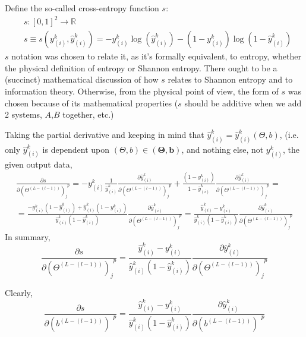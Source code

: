 \documentclass[10pt]{amsart}
\begin{document}
\begin{multicols*}{2}
Define the so-called cross-entropy function $s$:
\[
\begin{aligned}
& s:[0,1]^2 \to \mathbb{R} \\ 
& s\equiv s( y^k_{(i)}, \widehat{y}_{(i)}^k ) = -y^k_{(i)} \log{ (\widehat{y}^k_{(i)})} - (1-y^k_{(i)}) \log{ (1-\widehat{y}^k_{(i)})}  
\end{aligned}
\]
$s$ notation was chosen to relate it, as it's formally equivalent, to entropy, whether the physical definition of entropy or Shannon entropy.  There ought to be a (succinct) mathematical discussion of how $s$ relates to Shannon entropy and to information theory.  Otherwise, from the physical point of view, the form of $s$ was chosen because of its mathematical properties ($s$ should be additive when we add 2 systems, $A$,$B$ together, etc.)

Taking the partial derivative and keeping in mind that $\widehat{y}_{(i)}^k = \widehat{y}_{(i)}^k(\Theta,b)$, (i.e. only $\widehat{y}_{(i)}^k$ is dependent upon $(\Theta,b)\in (\mathbf{\Theta},\mathbf{b})$, and nothing else, not $y^k_{(i)}$, the given output data, 
\[
\begin{gathered}
\frac{\partial s}{ \partial (\Theta^{ (L-(l-1))})_j^{\  \  p} } = -y^k_{(i)} \frac{1}{ \widehat{y}_{(i)}^k  } \frac{\partial \widehat{y}_{(i)}^k }{ \partial ( \Theta^{(L-(l-1))})_j^{\  \  p } } +  \frac{ (1- y^k_{ (i)}) }{ 1- \widehat{y}_{(i)}^k } \frac{\partial \widehat{y}_{(i)}^k }{ \partial (\Theta^{(L-(l-1))})_j^{\  \  p} } = \\
= \frac{ - y^k_{(i)} (1- \widehat{y}^k_{(i)}) + \widehat{y}^k_{(i)} (1-y^k_{(i)}) }{ \widehat{y}^k_{(i)} ( 1 - \widehat{y}^k_{(i)}) } \frac{\partial \widehat{y}_{(i)}^k }{ \partial (\Theta^{(L-(l-1))})_j^{\  \  p} } = \frac{\widehat{y}_{(i)}^k - y_{(i)}^k }{ \widehat{y}_{(i)}^k (1 - \widehat{y}_{(i)}^k )} \frac{\partial \widehat{y}_{(i)}^k }{ \partial (\Theta^{(L-(l-1))})_j^{\  \  p} }
\end{gathered}
\] 
In summary, 
\begin{equation}
\frac{\partial s}{ \partial (\Theta^{ (L-(l-1))})_j^{\  \  p} } = \frac{\widehat{y}_{(i)}^k - y_{(i)}^k }{ \widehat{y}_{(i)}^k (1 - \widehat{y}_{(i)}^k )} \frac{\partial \widehat{y}_{(i)}^k }{ \partial (\Theta^{(L-(l-1))})_j^{\  \  p} }
\end{equation}


Clearly, 
\begin{equation}
\frac{\partial s}{ \partial (b^{ (L-(l-1))})^{\  \  p} } = \frac{\widehat{y}_{(i)}^k - y_{(i)}^k }{ \widehat{y}_{(i)}^k (1 - \widehat{y}_{(i)}^k )} \frac{\partial \widehat{y}_{(i)}^k }{ \partial ( b^{(L-(l-1))})^{\  \  p} }
\end{equation}



\end{multicols*}
\end{document}
